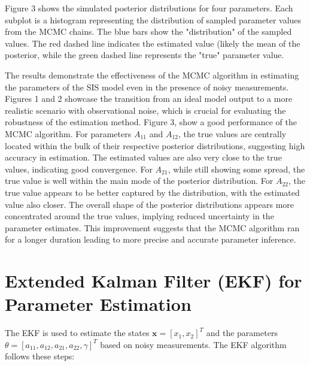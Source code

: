 \documentclass[a4paper,10pt]{report}
\begin{document}
Figure 3 shows the simulated posterior distributions for four parameters. Each subplot is a histogram representing the distribution of sampled parameter values from the MCMC chains. The blue bars show the "distribution" of the sampled values. The red dashed line indicates the estimated value (likely the mean of the posterior, while the green dashed line represents the "true" parameter value.

The results demonstrate the effectiveness of the MCMC algorithm in estimating the parameters of the SIS model even in the presence of noisy measurements. Figures 1 and 2 showcase the transition from an ideal model output to a more realistic scenario with observational noise, which is crucial for evaluating the robustness of the estimation method. Figure 3, show a good performance of the MCMC algorithm. For parameters $A_{11}$ and $A_{12}$, the true values are centrally located within the bulk of their respective posterior distributions, suggesting high accuracy in estimation. The estimated values are also very close to the true values, indicating good convergence. For $A_{21}$, while still showing some spread, the true value is well within the main mode of the posterior distribution. For $A_{22}$, the true value appears to be better captured by the distribution, with the estimated value also closer. The overall shape of the posterior distributions appears more concentrated around the true values, implying reduced uncertainty in the parameter estimates. This improvement suggests that the MCMC algorithm ran for a longer duration leading to more precise and accurate parameter inference.

\vspace{2cm}
\section{Extended Kalman Filter (EKF) for Parameter Estimation}

The EKF is used to estimate the states \( \mathbf{x} = [x_1, x_2]^T \) and the parameters \( \theta = [a_{11}, a_{12}, a_{21}, a_{22}, \gamma]^T \) based on noisy measurements. The EKF algorithm follows these steps:
\end{document}
